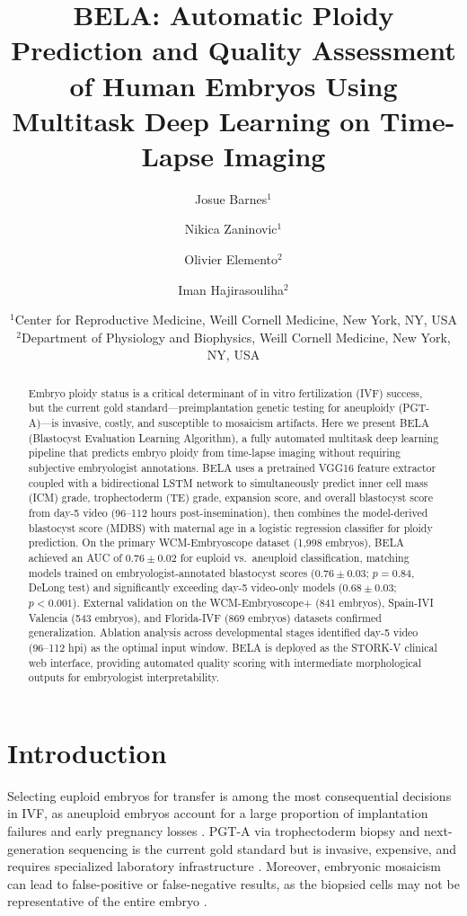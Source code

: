 \documentclass[11pt]{article}
\title{BELA: Automatic Ploidy Prediction and Quality Assessment of Human Embryos Using Multitask Deep Learning on Time-Lapse Imaging}
\author{
  Josue Barnes$^{1}$ \and
  Nikica Zaninovic$^{1}$ \and
  Olivier Elemento$^{2}$ \and
  Iman Hajirasouliha$^{2}$
}
\date{
  $^{1}$Center for Reproductive Medicine, Weill Cornell Medicine, New York, NY, USA \\
  $^{2}$Department of Physiology and Biophysics, Weill Cornell Medicine, New York, NY, USA
}
\begin{document}
\maketitle

\begin{abstract}
Embryo ploidy status is a critical determinant of in vitro fertilization (IVF) success, but the current gold standard---preimplantation genetic testing for aneuploidy (PGT-A)---is invasive, costly, and susceptible to mosaicism artifacts. Here we present BELA (Blastocyst Evaluation Learning Algorithm), a fully automated multitask deep learning pipeline that predicts embryo ploidy from time-lapse imaging without requiring subjective embryologist annotations. BELA uses a pretrained VGG16 feature extractor coupled with a bidirectional LSTM network to simultaneously predict inner cell mass (ICM) grade, trophectoderm (TE) grade, expansion score, and overall blastocyst score from day-5 video (96--112 hours post-insemination), then combines the model-derived blastocyst score (MDBS) with maternal age in a logistic regression classifier for ploidy prediction. On the primary WCM-Embryoscope dataset (1,998 embryos), BELA achieved an AUC of $0.76 \pm 0.02$ for euploid vs.\ aneuploid classification, matching models trained on embryologist-annotated blastocyst scores ($0.76 \pm 0.03$; $p = 0.84$, DeLong test) and significantly exceeding day-5 video-only models ($0.68 \pm 0.03$; $p < 0.001$). External validation on the WCM-Embryoscope+ (841 embryos), Spain-IVI Valencia (543 embryos), and Florida-IVF (869 embryos) datasets confirmed generalization. Ablation analysis across developmental stages identified day-5 video (96--112 hpi) as the optimal input window. BELA is deployed as the STORK-V clinical web interface, providing automated quality scoring with intermediate morphological outputs for embryologist interpretability.
\end{abstract}

\section{Introduction}

Selecting euploid embryos for transfer is among the most consequential decisions in IVF, as aneuploid embryos account for a large proportion of implantation failures and early pregnancy losses \citep{grifo2013, scott2013}. PGT-A via trophectoderm biopsy and next-generation sequencing is the current gold standard but is invasive, expensive, and requires specialized laboratory infrastructure \citep{munne2019, fragouli2017}. Moreover, embryonic mosaicism can lead to false-positive or false-negative results, as the biopsied cells may not be representative of the entire embryo \citep{fragouli2017}.
\end{document}
